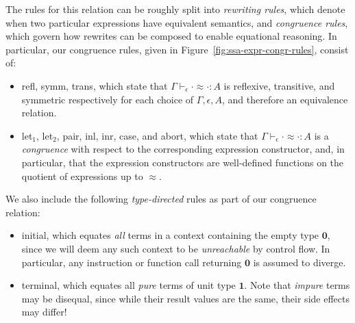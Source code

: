\documentclass[acmsmall,screen,review]{acmart}
\newcommand{\mb}[1]{\ensuremath{\mathbf{#1}}}
\newcommand{\teqv}{\approx}
\newcommand{\tmeq}[5]{#1 \vdash_{#2} #3 \teqv #4 : {#5}}
\newcommand{\brle}[1]{{\textsf{#1}}}
\begin{document}
The rules for this relation can be roughly split into \emph{rewriting rules}, which denote when two
particular expressions have equivalent semantics, and \emph{congruence rules}, which govern how
rewrites can be composed to enable equational reasoning. In particular, our congruence rules, given
in Figure~\ref{fig:ssa-expr-congr-rules}, consist of:
\begin{itemize}
  \item \brle{refl}, \brle{symm}, \brle{trans}, which state that
  $\tmeq{\Gamma}{\epsilon}{\cdot}{\cdot}{A}$ is reflexive, transitive, and symmetric respectively
  for each choice of $\Gamma, \epsilon, A$, and therefore an equivalence relation.
  \item \brle{let$_1$}, \brle{let$_2$}, \brle{pair}, \brle{inl}, \brle{inr}, \brle{case}, and
  \brle{abort}, which state that $\tmeq{\Gamma}{\epsilon}{\cdot}{\cdot}{A}$ is a \emph{congruence}
  with respect to the corresponding expression constructor, and, in particular, that the expression
  constructors are well-defined functions on the quotient of expressions up to $\teqv$.
\end{itemize} 
We also include the following \emph{type-directed} rules as part of our congruence relation:
\begin{itemize}
  \item \brle{initial}, which equates \emph{all} terms in a context containing the empty type
  $\mb{0}$, since we will deem any such context to be \emph{unreachable} by control flow. In
  particular, any instruction or function call returning $\mb{0}$ is assumed to diverge. 
  \item \brle{terminal}, which equates all \emph{pure} terms of unit type $\mb{1}$. Note that
  \emph{impure} terms may be disequal, since while their result values are the same, their side
  effects may differ!
\end{itemize}
\end{document}
